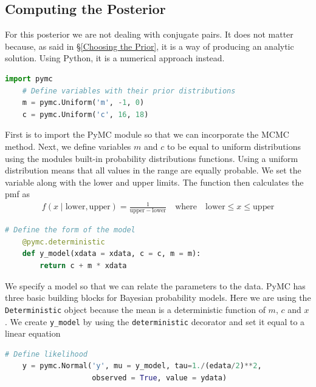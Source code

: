 \documentclass[12pt,twoside]{report}   %
\def\ContinueLineNumber{\lstset{firstnumber=last}}
\begin{document}
\subsection{Computing the Posterior}\label{Computing the Posterior2}

For this posterior we are not dealing with conjugate pairs. It does not matter because, as said in \S\ref{Choosing the Prior}, it is a way of producing an analytic solution. Using Python, it is a numerical approach instead.

\begin{lstlisting}[label={python code 1},caption={PyMC priors},language=Python]
	import pymc
	# Define variables with their prior distributions
	m = pymc.Uniform('m', -1, 0)
	c = pymc.Uniform('c', 16, 18)
\end{lstlisting}

First is to import the PyMC module so that we can incorporate the MCMC method. Next, we define variables $m$ and $c$ to be equal to uniform distributions using the modules built-in probability distributions functions. Using a uniform distribution means that all values in the range are equally probable. We set the variable along with the lower and upper limits. The function then calculates the pmf as
\begin{align*}
f(x\mid \mathrm{lower}, \mathrm{upper}) = \frac{1}{\mathrm{upper} - \mathrm{lower}}\quad\text{where}\quad\mathrm{lower}\leq x\leq\mathrm{upper}
\end{align*}

\ContinueLineNumber
\begin{lstlisting}[label={python code 2},caption={PyMC model},language=Python]
	# Define the form of the model
	@pymc.deterministic
	def y_model(xdata = xdata, c = c, m = m):
    	return c + m * xdata
\end{lstlisting}

We specify a model so that we can relate the parameters to the data. PyMC has three basic building blocks for Bayesian probability models. Here we are using the \texttt{Deterministic} object because the mean is a deterministic function of $m$, $c$ and $x$. We create \texttt{y\_model} by using the \texttt{deterministic} decorator and set it equal to a linear equation
\begin{lstlisting}[label={python code 3},caption={PyMC likelihood},language=Python]
	# Define likelihood
	y = pymc.Normal('y', mu = y_model, tau=1./(edata/2)**2,
	                observed = True, value = ydata)
\end{lstlisting}
\end{document}
